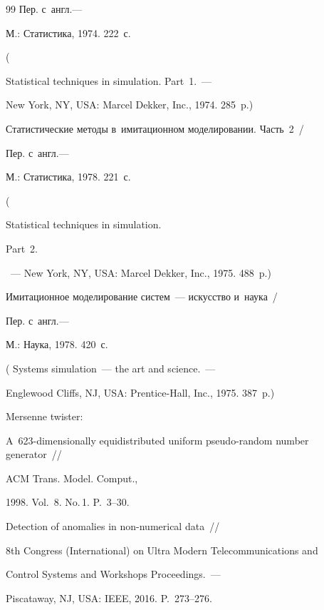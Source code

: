 {{\begin{thebibliography}{99}
Пер. с~англ.--- 


М.:  Статистика, 1974. 222~с.


( 


{Statistical techniques in simulation. Part~1.}~--- 


New  York, NY, USA: Marcel Dekker, Inc., 1974. 285~p.)




 Статистические методы в~имитационном моделировании. Часть~2~/


Пер. с~англ.--- 


 М.:  Статистика, 1978. 221~с.


 ( {Statistical techniques in simulation. 


Part~2.}~--- New  York, NY, USA: Marcel Dekker, Inc., 1975.  488~p.)




 Имитационное моделирование систем~--- искусство и~наука~/


Пер. с~англ.---  


М.: Наука,  1978.  420~с.


( {Systems simulation~--- the art and science}.~---


Englewood Cliffs, NJ, USA: Prentice-Hall, Inc., 1975. 387~p.)




 Mersenne twister: 


A~623-dimensionally equidistributed  uniform pseudo-random number generator~/\!\!/ 


ACM Trans. Model. Comput., 


1998. Vol.~8. No.\,1. P.~3--30.






Detection of anomalies in non-numerical data~/\!\!/ 


8th  Congress (International) on Ultra Modern Telecommunications and 


Control Systems and Workshops Proceedings.~--- 


Piscataway, NJ, USA: IEEE, 2016. P.~273--276.





       \end{thebibliography}


} }








